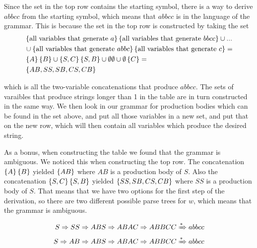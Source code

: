\documentclass{article}
\begin{document}
Since the set in the top row contains the starting symbol, there is a way to derive $abbcc$ from the starting symbol, which means that $abbcc$ is in the language of the grammar. This is because the set in the top row is constructed by taking the set 
\begin{align*}
    &\set{\text{all variables that generate } a}\set{\text{all variables that generate } bbcc} \cup ... 
    \\
    &\cup \set{\text{all variables that generate } abbc}\set{\text{all variables that generate } c} = 
    \\
    &\set{A}\set{B} \cup \set{S,C}\set{S,B} \cup \emptyset\emptyset \cup \emptyset\set{C} =
    \\
    &\set{AB, SS, SB, CS, CB}
\end{align*}

which is all the two-variable concatenations that produce $abbcc$. The sets of varaibles that produce strings longer than 1 in the table are in turn constructed in the same way. We then look in our grammar for production bodies which can be found in the set above, and put all those variables in a new set, and put that on the new row, which will then contain all variables which produce the desired string.

As a bonus, when constructing the table we found that the grammar is ambiguous. We noticed this when constructing the top row. The concatenation $\set{A}\set{B}$ yielded $\set{AB}$ where $AB$ is a production body of $S$. Also the concatenation $\set{S,C}\set{S,B}$ yielded $\set{SS,SB,CS,CB}$ where $SS$ is a production body of $S$. That means that we have two options for the first step of the derivation, so there are two different possible parse trees for $w$, which means that the grammar is ambiguous.

\begin{align*}
        S \Rightarrow SS \Rightarrow ABS \Rightarrow ABAC \Rightarrow ABBCC \xRightarrow{*} abbcc \\
        S \Rightarrow AB \Rightarrow ABS \Rightarrow ABAC \Rightarrow ABBCC \xRightarrow{*} abbcc \\    
\end{align*}
\end{document}
